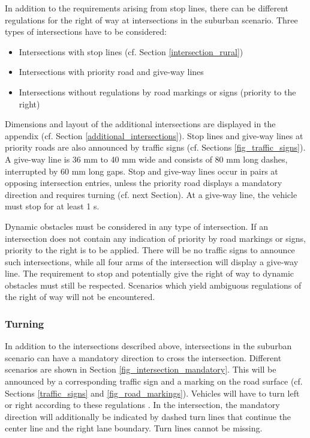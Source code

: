 In addition to the requirements arising from stop lines, there can be different
regulations for the right of way at intersections in the suburban scenario.
Three types of intersections have to be considered:

\begin{itemize}
	\item Intersections with stop lines (cf. Section \ref{intersection_rural})
	\item Intersections with priority road and give-way lines
	\item Intersections without regulations by road markings or signs (priority to the
	      right)
\end{itemize}

Dimensions and layout of the additional intersections are displayed in the
appendix (cf. Section \ref{additional_intersections}). Stop lines and give-way
lines at priority roads are also announced by traffic signs (cf. Sections
\ref{fig_traffic_signs}). A give-way line is 36 mm to 40 mm wide and consists
of 80 mm long dashes, interrupted by 60 mm long gaps. Stop and give-way lines
occur in pairs at opposing intersection entries, unless the priority road
displays a mandatory direction and requires turning (cf. next Section). At a
give-way line, the vehicle must stop for at least 1 s.

Dynamic obstacles must be considered in any type of intersection. If an
intersection does not contain any indication of priority by road markings or
signs, priority to the right is to be applied. There will be no traffic signs
to announce such intersections, while all four arms of the intersection will
display a give-way line. The requirement to stop and potentially give the right
of way to dynamic obstacles must still be respected. Scenarios which yield
ambiguous regulations of the right of way will not be encountered.

\subsubsection{Turning}
\label{turning}

In addition to the intersections described above, intersections in the suburban
scenario can have a mandatory direction to cross the intersection. Different
scenarios are shown in Section \ref{fig_intersection_mandatory}. This will be
announced by a corresponding traffic sign and a marking on the road surface
(cf. Sections \ref{traffic_signs} and \ref{fig_road_markings}). Vehicles will
have to turn left or right according to these regulations . In the intersection, the
mandatory direction will additionally be indicated by dashed turn lines that
continue the center line and the right lane boundary. Turn lines cannot be
missing.

